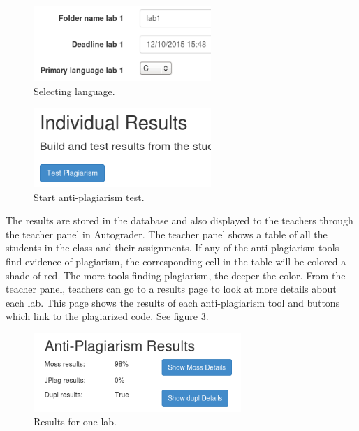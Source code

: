 \documentclass[10pt,journal,compsoc]{IEEEtran}
\begin{document}
		\begin{figure}[h!]
			\includegraphics[width=0.6\textwidth]{SelectingLanguage.png}
			\caption{Selecting language.}
			\label{fig:selectLang}
		\end{figure}
		
		\begin{figure}[h!]
			\includegraphics[width=0.6\textwidth]{StartTest.png}
			\caption{Start anti-plagiarism test.}
			\label{fig:startTest}
		\end{figure}
		
		The results are stored in the database and also displayed to the teachers through the teacher panel in Autograder. The teacher panel shows a table of all the students in the class and their assignments. If any of the anti-plagiarism tools find evidence of plagiarism, the corresponding cell in the table will be colored a shade of red. The more tools finding plagiarism, the deeper the color. From the teacher panel, teachers can go to a results page to look at more details about each lab. This page shows the results of each anti-plagiarism tool and buttons which link to the plagiarized code. See figure \ref{fig:labresults}.
		
		\begin{figure}[h!]
			\includegraphics[width=0.7\textwidth]{LabResults.png}
			\caption{Results for one lab.}
			\label{fig:labresults}
		\end{figure}
		
\end{document}
